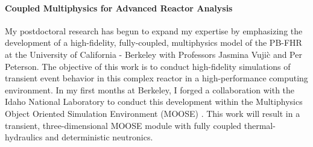 \documentclass[a4paper, 12pt]{article}
\begin{document}
%

\paragraph{Coupled Multiphysics for Advanced Reactor Analysis}

My postdoctoral research has begun to expand my expertise by emphasizing the 
development of a high-fidelity, fully-coupled, multiphysics model of the PB-FHR 
at the University of California - Berkeley with Professors Jasmina Vuji\`c and Per 
Peterson. The objective of this work is to conduct high-fidelity simulations of 
transient event behavior in this complex reactor in a high-performance computing 
environment.  In my first months at Berkeley, I forged a collaboration with the 
Idaho National Laboratory to conduct this development within the Multiphysics 
Object Oriented Simulation Environment (MOOSE) \cite{gaston_moose:_2009}. This 
work will result in a transient, three-dimensional MOOSE module with fully 
coupled thermal-hydraulics and deterministic neutronics.  


\end{document}
